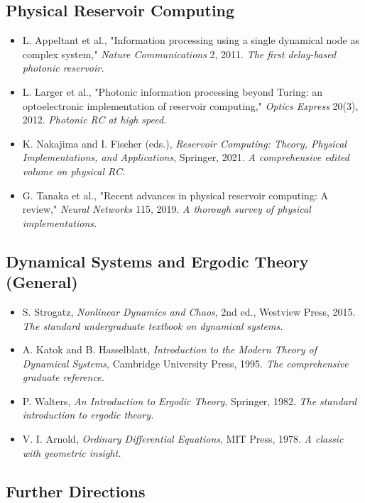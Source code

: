 \subsection{Physical Reservoir Computing}

\begin{itemize}[nosep]
  \item L. Appeltant et al., "Information processing using a single dynamical node as complex system," \textit{Nature Communications} 2, 2011. \textit{The first delay-based photonic reservoir.}
  \item L. Larger et al., "Photonic information processing beyond Turing: an optoelectronic implementation of reservoir computing," \textit{Optics Express} 20(3), 2012. \textit{Photonic RC at high speed.}
  \item K. Nakajima and I. Fischer (eds.), \textit{Reservoir Computing: Theory, Physical Implementations, and Applications}, Springer, 2021. \textit{A comprehensive edited volume on physical RC.}
  \item G. Tanaka et al., "Recent advances in physical reservoir computing: A review," \textit{Neural Networks} 115, 2019. \textit{A thorough survey of physical implementations.}
\end{itemize}

\subsection{Dynamical Systems and Ergodic Theory (General)}

\begin{itemize}[nosep]
  \item S. Strogatz, \textit{Nonlinear Dynamics and Chaos}, 2nd ed., Westview Press, 2015. \textit{The standard undergraduate textbook on dynamical systems.}
  \item A. Katok and B. Hasselblatt, \textit{Introduction to the Modern Theory of Dynamical Systems}, Cambridge University Press, 1995. \textit{The comprehensive graduate reference.}
  \item P. Walters, \textit{An Introduction to Ergodic Theory}, Springer, 1982. \textit{The standard introduction to ergodic theory.}
  \item V. I. Arnold, \textit{Ordinary Differential Equations}, MIT Press, 1978. \textit{A classic with geometric insight.}
\end{itemize}

\subsection{Further Directions}

